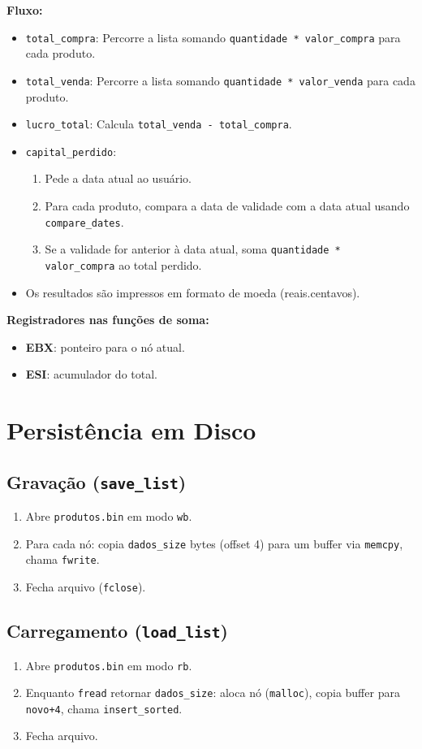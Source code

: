 \documentclass[12pt]{article}
\begin{document}
\textbf{Fluxo:}
\begin{itemize}
    \item \texttt{total\_compra}: Percorre a lista somando \texttt{quantidade * valor\_compra} para cada produto.
    \item \texttt{total\_venda}: Percorre a lista somando \texttt{quantidade * valor\_venda} para cada produto.
    \item \texttt{lucro\_total}: Calcula \texttt{total\_venda - total\_compra}.
    \item \texttt{capital\_perdido}:
        \begin{enumerate}
            \item Pede a data atual ao usuário.
            \item Para cada produto, compara a data de validade com a data atual usando \texttt{compare\_dates}.
            \item Se a validade for anterior à data atual, soma \texttt{quantidade * valor\_compra} ao total perdido.
        \end{enumerate}
    \item Os resultados são impressos em formato de moeda (reais.centavos).
\end{itemize}

\textbf{Registradores nas funções de soma:}
\begin{itemize}
    \item \textbf{EBX}: ponteiro para o nó atual.
    \item \textbf{ESI}: acumulador do total.
\end{itemize}

\section{Persistência em Disco}
\subsection*{Gravação (\texttt{save\_list})}
\begin{enumerate}
  \item Abre \texttt{produtos.bin} em modo \texttt{wb}.
  \item Para cada nó: copia \texttt{dados\_size} bytes (offset 4) para um buffer via \texttt{memcpy}, chama \texttt{fwrite}.
  \item Fecha arquivo (\texttt{fclose}).
\end{enumerate}

\subsection*{Carregamento (\texttt{load\_list})}
\begin{enumerate}
  \item Abre \texttt{produtos.bin} em modo \texttt{rb}.
  \item Enquanto \texttt{fread} retornar \texttt{dados\_size}: aloca nó (\texttt{malloc}), copia buffer para \texttt{novo+4}, chama \texttt{insert\_sorted}.
  \item Fecha arquivo.
\end{enumerate}
\end{document}
